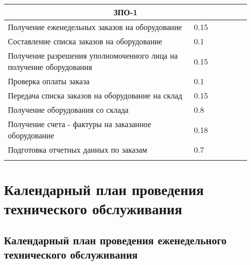 \documentclass[a4paper,14pt]{extarticle}
\begin{document}
\begin{longtable}{|p{0.75\linewidth}|m{0.23\linewidth}|}
		\multicolumn{ 2}{|c|}{ЗПО-1} \\ \hline
		Получение еженедельных заказов на 
		оборудование  & 0.15 \\ \hline
		Составление списка заказов на 
		оборудование  & 0.1 \\ \hline
		Получение разрешения уполномоченного 
		лица на получение оборудования  & 0.15 \\ \hline
		Проверка оплаты заказа  & 0.1 \\ \hline
		Передача списка заказов на 
		оборудование на склад  & 0.15 \\ \hline
		Получение оборудования со склада  & 0.8 \\ \hline
		Получение счета - фактуры на 
		заказанное оборудование  & 0.18 \\ \hline
		Подготовка отчетных данных по 
		заказам  & 0.7 \\ \hline

		\label{tab:year}
	\end{longtable}



\newpage
\section*{Календарный план проведения технического обслуживания}
\subsection*{Календарный план проведения еженедельного технического обслуживания}
\end{document}
